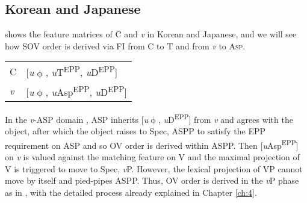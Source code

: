 \subsection{Korean and Japanese}\label{ch6:sect:KRJN}

 shows the feature matrices of C and \textit{v} in Korean and Japanese, and we will see how \ac{SOV} order is derived via \ac{FI} from C to T and from \textit{v} to A\textsc{sp.} 

\ea\label{ex:159}\begin{tabular}[t]{ll}
    C & [\textit{u}$\upphi$, \textit{u}T\textsuperscript{EPP}, \textit{u}D\textsuperscript{\ac{EPP}}] \\
    \textit{v} &   [\textit{u}$\upphi$, \textit{u}Asp\textsuperscript{EPP}, \textit{u}D\textsuperscript{\ac{EPP}}]
\end{tabular}
\z

In the \textit{v}-\ac{ASP} domain , \ac{ASP} inherits [\textit{u}$\upphi$, \textit{u}D\textsuperscript{\ac{EPP}}] from \textit{v} and agrees with the object, after which  the object raises to Spec, \ac{ASP}P to satisfy the \ac{EPP} requirement on \ac{ASP} and so \ac{OV} order is derived within \ac{ASP}P. Then [\textit{u}Asp\textsuperscript{\ac{EPP}}] on \textit{v} is valued against the matching feature on V and the maximal projection of V is triggered to move to Spec, \textit{v}P. However, the lexical projection of \ac{VP} cannot move by itself and pied-pipes \ac{ASP}P. Thus, \ac{OV} order is derived in the \textit{v}P phase as in , with the detailed process already explained in Chapter \ref{ch:4}.

\ea\label{ex:160} 

